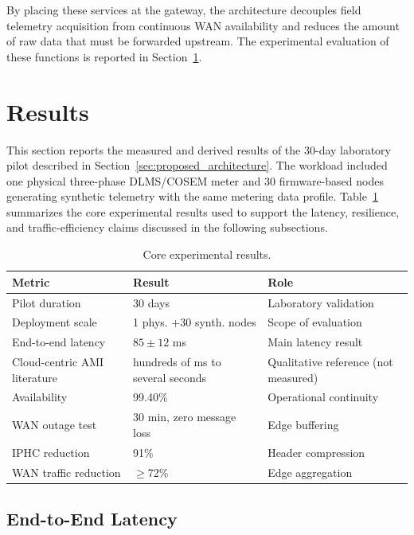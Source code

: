 \documentclass[conference]{IEEEtran}
\begin{document}
By placing these services at the gateway, the architecture decouples field telemetry acquisition from continuous WAN availability and reduces the amount of raw data that must be forwarded upstream. The experimental evaluation of these functions is reported in Section~\ref{sec:results}.

\section{Results}
\label{sec:results}
This section reports the measured and derived results of the 30-day laboratory pilot described in Section~\ref{sec:proposed_architecture}. The workload included one physical three-phase DLMS/COSEM meter and 30 firmware-based nodes generating synthetic telemetry with the same metering data profile. Table~\ref{tab:core_results} summarizes the core experimental results used to support the latency, resilience, and traffic-efficiency claims discussed in the following subsections.

\begin{table}[t]
\caption{Core experimental results.}
\label{tab:core_results}
\centering
\begin{tabular}{p{}p{}p{}}
\hline
\textbf{Metric} & \textbf{Result} & \textbf{Role} \\
\hline
Pilot duration & 30 days & Laboratory validation \\
Deployment scale & 1 phys. +30 synth. nodes & Scope of evaluation \\
End-to-end latency & $85 \pm 12$ ms & Main latency result \\
Cloud-centric AMI literature & hundreds of ms to several seconds~\cite{minhEdgeComputingIoTEnabled2022,alsafranChallengesImplementingIoT2025} & Qualitative reference (not measured) \\
Availability & 99.40\% & Operational continuity \\
WAN outage test & 30 min, zero message loss & Edge buffering \\
IPHC reduction & 91\% & Header compression \\
WAN traffic reduction & $\geq$72\% & Edge aggregation \\
\hline
\end{tabular}
\end{table}

\subsection{End-to-End Latency}
\label{subsec:results_latency}
\end{document}
